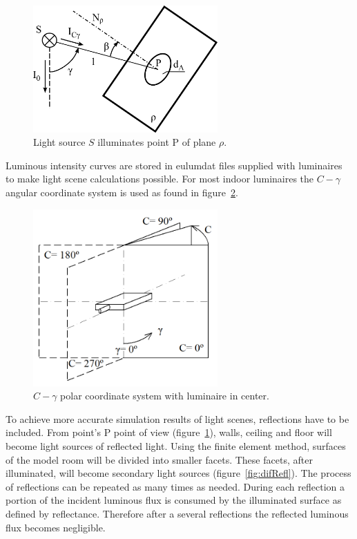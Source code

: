 \begin{figure}[htb]
  \centering
  \includegraphics[width=200pt]{315_osvetlenost_bodovym_zdrojem_2}
  \caption{Light source $S$ illuminates point P of plane $\rho$.}
  \label{fig:osv}
\end{figure}

Luminous intensity curves are stored in eulumdat files supplied with luminaires to make light scene calculations possible. For most indoor luminaires the $C-\gamma$ angular coordinate system is used as found in figure~\ref{fig:cgamma}.

\begin{figure}[htb]
  \centering
  \includegraphics[width=200pt]{Cgama}
  \caption{$C-\gamma$ polar coordinate system with luminaire in center.}
  \label{fig:cgamma}
\end{figure}

To achieve more accurate simulation results of light scenes, reflections have to be included. From point's P point of view (figure~\ref{fig:osv}), walls, ceiling and floor will become light sources of reflected light. Using the finite element method, surfaces of the model room will be divided into smaller facets. These facets, after illuminated, will become secondary light sources (figure~\ref{fig:difRefl}). The process of reflections can be repeated as many times as needed. During each reflection a portion of the incident luminous flux is consumed by the illuminated surface as defined by reflectance. Therefore after a several reflections the reflected luminous flux becomes negligible.

